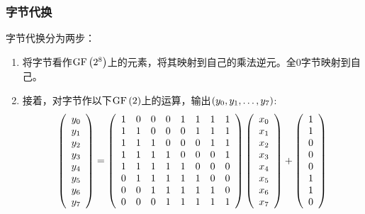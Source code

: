 \subsubsection{字节代换}
字节代换分为两步：
\begin{enumerate}
    \item 将字节看作$\mathrm{GF}\left( {2^8}\right)$上的元素，将其映射到自己的乘法逆元。全0字节映射到自己。
    \item 接着，对字节作以下$\mathrm{GF}\left( {2}\right)$上的运算，输出$\left( {y_0, y_1, \ldots ,y_7}\right)$:
    \begin{equation}
    \pth{\begin{array}{c}y_0\\y_1\\y_2\\y_3\\y_4\\y_5\\y_6\\y_7\end{array}}=\pth{
\begin{array}{cccccccc}
1     & 0     & 0     & 0     & 1     & 1     & 1     & 1 \\
1     & 1     & 0     & 0     & 0     & 1     & 1     & 1 \\
1     & 1     & 1     & 0     & 0     & 0     & 1     & 1 \\
1     & 1     & 1     & 1     & 0     & 0     & 0     & 1 \\
1     & 1     & 1     & 1     & 1     & 0     & 0     & 0 \\
0     & 1     & 1     & 1     & 1     & 1     & 0     & 0 \\
0     & 0     & 1     & 1     & 1     & 1     & 1     & 0 \\
0     & 0     & 0     & 1     & 1     & 1     & 1     & 1 \\
\end{array}%
}\pth{\begin{array}{c}x_0\\x_1\\x_2\\x_3\\x_4\\x_5\\x_6\\x_7\end{array}}+\pth{\begin{array}{c}1\\1\\0\\0\\0\\1\\1\\0\end{array}}
    \end{equation}
\end{enumerate}

